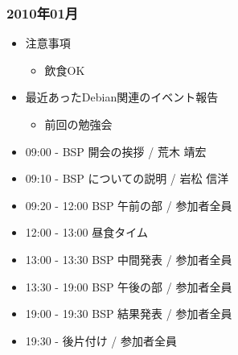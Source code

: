 \frame{\titlepage{}}



\begin{frame}
 \frametitle{2010年01月}
\begin{minipage}[t]{0.45\hsize}
  \begin{itemize}
  \item 注意事項
	\begin{itemize}
	 \item 飲食OK
	\end{itemize}
  \item 最近あったDebian関連のイベント報告
	\begin{itemize}
	 \item 前回の勉強会
	\end{itemize}
 \end{itemize}
\end{minipage} 
\begin{minipage}[t]{0.45\hsize}
 \begin{itemize}
  \item 09:00 - BSP 開会の挨拶 / 荒木 靖宏
  \item 09:10 - BSP についての説明 / 岩松 信洋
  \item 09:20 - 12:00 BSP 午前の部 / 参加者全員
  \item 12:00 - 13:00 昼食タイム
  \item 13:00 - 13:30 BSP 中間発表 / 参加者全員
  \item 13:30 - 19:00 BSP 午後の部 / 参加者全員
  \item 19:00 - 19:30 BSP 結果発表 / 参加者全員
  \item 19:30 - 後片付け / 参加者全員
 \end{itemize}
\end{minipage}
\end{frame}

